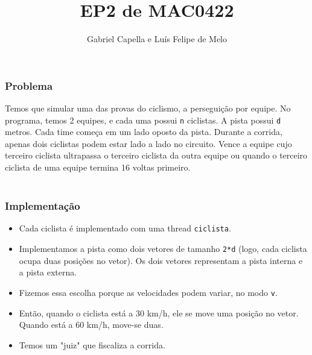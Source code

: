 \documentclass{beamer}
\title[EP2]{EP2 de MAC0422} %
\author{Gabriel Capella e Luís Felipe de Melo} %
\institute[USP] %
{
Universidade de São Paulo \\ %
\medskip
}
\begin{document}
\begin{frame}
\titlepage %
\end{frame}




\begin{frame}
\frametitle{Problema}
Temos que simular uma das provas do ciclismo, a perseguição por equipe. No programa, temos 2 equipes, e cada uma possui \texttt{n} ciclistas. A pista possui \texttt{d} metros. Cada time começa em um lado oposto da pista. Durante a corrida, apenas dois ciclistas podem estar lado a lado no circuito. Vence a equipe cujo terceiro ciclista ultrapassa o terceiro ciclista da outra equipe ou quando o terceiro ciclista de uma equipe termina 16 voltas primeiro.\\~\\

\end{frame}

\begin{frame}
\frametitle{Implementação}	
\begin{itemize}
\item Cada ciclista é implementado com uma thread \texttt{ciclista}. 
\item Implementamos a pista como dois vetores de tamanho \texttt{2*d} (logo, cada ciclista ocupa duas posições no vetor). Os dois vetores representam a pista interna e a pista externa.
\item Fizemos essa escolha porque as velocidades podem variar, no modo \texttt{v}. 
\item Então, quando o ciclista está a 30 km/h, ele se move uma posição no vetor. Quando está a 60 km/h, move-se duas.
\item Temos um "juiz" que fiscaliza a corrida.
\end{itemize}
\end{frame}
\end{document}
